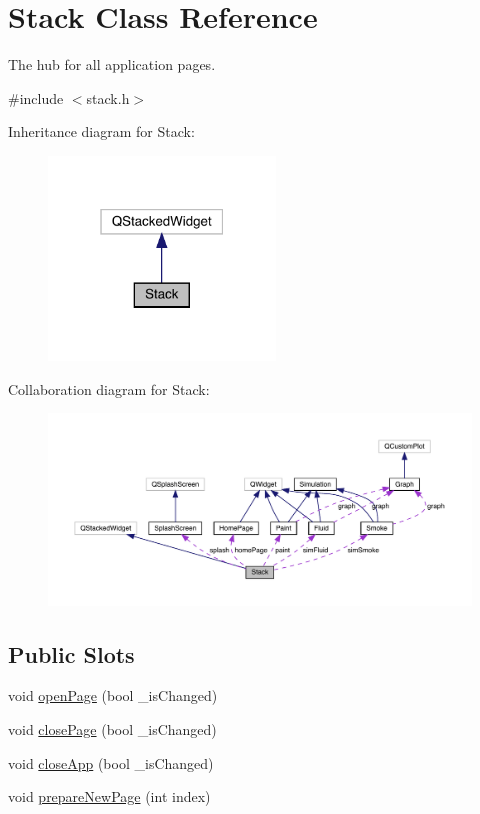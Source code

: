 \hypertarget{classStack}{}\section{Stack Class Reference}
\label{classStack}


The hub for all application pages.  




{\ttfamily \#include $<$stack.\+h$>$}



Inheritance diagram for Stack\+:\nopagebreak
\begin{figure}[H]
\begin{center}
\leavevmode
\includegraphics[width=171pt]{classStack__inherit__graph}
\end{center}
\end{figure}


Collaboration diagram for Stack\+:\nopagebreak
\begin{figure}[H]
\begin{center}
\leavevmode
\includegraphics[width=350pt]{classStack__coll__graph}
\end{center}
\end{figure}
\subsection*{Public Slots}
\begin{DoxyCompactItemize}
\item 
void \mbox{\hyperlink{classStack_a3663db1c1578aabe63286d4f2bb6fc6f}{open\+Page}} (bool \+\_\+is\+Changed)
\item 
void \mbox{\hyperlink{classStack_a69cd464c336cb480ad54ac2c83c309e1}{close\+Page}} (bool \+\_\+is\+Changed)
\item 
void \mbox{\hyperlink{classStack_a2f8a3dee32407abe994b7332282d03de}{close\+App}} (bool \+\_\+is\+Changed)
\item 
void \mbox{\hyperlink{classStack_a836814b5492af3a0a4cc613d11b56397}{prepare\+New\+Page}} (int index)
\end{DoxyCompactItemize}
